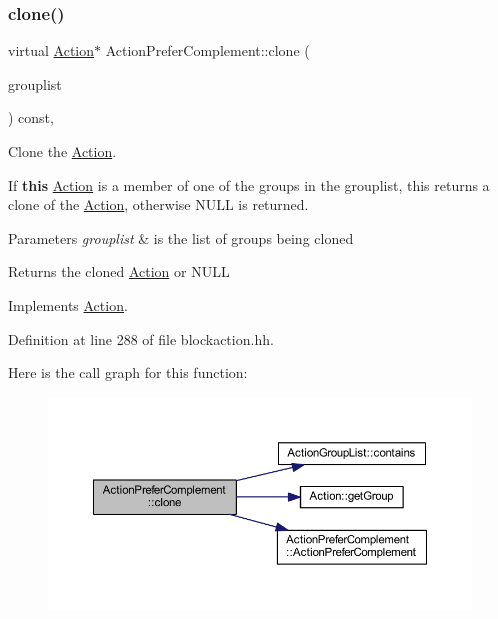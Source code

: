 \subsubsection{\texorpdfstring{clone()}{clone()}}
{\footnotesize\ttfamily virtual \mbox{\hyperlink{class_action}{Action}}$\ast$ Action\+Prefer\+Complement\+::clone (\begin{DoxyParamCaption}\item[{const \mbox{\hyperlink{class_action_group_list}{Action\+Group\+List}} \&}]{grouplist }\end{DoxyParamCaption}) const\hspace{0.3cm}{\ttfamily [inline]}, {\ttfamily [virtual]}}



Clone the \mbox{\hyperlink{class_action}{Action}}. 

If {\bfseries{this}} \mbox{\hyperlink{class_action}{Action}} is a member of one of the groups in the grouplist, this returns a clone of the \mbox{\hyperlink{class_action}{Action}}, otherwise N\+U\+LL is returned. 
\begin{DoxyParams}{Parameters}
{\em grouplist} & is the list of groups being cloned \\
\hline
\end{DoxyParams}
\begin{DoxyReturn}{Returns}
the cloned \mbox{\hyperlink{class_action}{Action}} or N\+U\+LL 
\end{DoxyReturn}


Implements \mbox{\hyperlink{class_action_af8242e41d09e5df52f97df9e65cc626f}{Action}}.



Definition at line 288 of file blockaction.\+hh.

Here is the call graph for this function\+:
\nopagebreak
\begin{figure}[H]
\begin{center}
\leavevmode
\includegraphics[width=350pt]{class_action_prefer_complement_a39b68f861f1e99b1412cf78f5dff888a_cgraph}
\end{center}
\end{figure}


